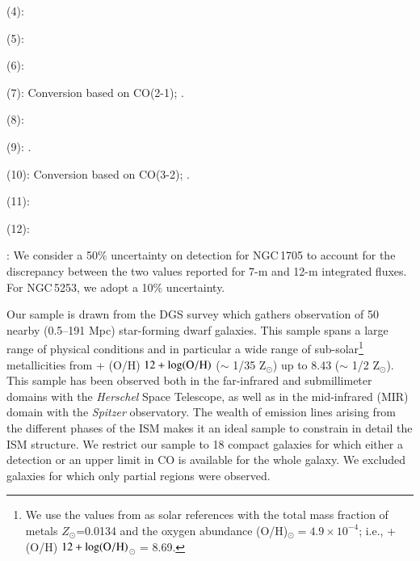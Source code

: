 \documentclass{aa}
\newcommand{\oh}{\ifmmode 12 + \log({\rm O/H}) \else$12 + \log({\rm O/H})$\fi}
\begin{document}
\begin{table}[t!]
\begin{threeparttable}
\begin{tablenotes}
   \item (4): \cite{Cormier_2014}
   \item (5): \cite{Kobulnicky_1995}
   \item (6): \cite{Young_1995}
   \item (7): Conversion based on CO(2-1); \cite{Zhou_co_2021}. %
   \item (8): \cite{Greve_1996}
   \item (9): \cite{Hunt_2023}. 
   \item (10): Conversion based on CO(3-2); \cite{Hunt_2014}. %
   \item (11): \cite{Sage_1992}
   \item (12): \cite{Leroy_2005}
   \item *: We consider a 50\% uncertainty on detection for  NGC\,1705 to account for the discrepancy between the two values reported for 7-m and 12-m integrated fluxes. For NGC\,5253, we adopt a 10\% uncertainty.
\end{tablenotes}

\end{threeparttable}
\end{table}

Our sample is drawn from the DGS survey \citep{Madden_2013} which gathers observation of 50 nearby (0.5--191 Mpc) star-forming dwarf galaxies. This sample spans a large range of physical conditions and in particular a wide range of sub-solar\footnote{We use the values from \cite{Asplund_2009} as solar references with the total mass fraction of metals $Z_{\odot}$=0.0134 and the oxygen abundance (O/H)$_{\odot} = 4.9 \times 10^{-4}$; i.e., \oh$_{\odot}$ = 8.69.} metallicities from \oh=7.14 ($\sim$ 1/35 Z$_\odot$) up to 8.43 ($\sim$ 1/2 Z$_\odot$).
This sample has been observed both in the far-infrared and submillimeter domains with the \textit{Herschel} Space Telescope, as well as in the mid-infrared (MIR) domain with the \textit{Spitzer} observatory. The wealth of emission lines arising from the different phases of the ISM makes it an ideal sample to constrain in detail the ISM structure. We restrict our sample to 18 compact galaxies for which either a detection or an upper limit in CO is available for the whole galaxy. We excluded galaxies for which only partial regions were observed. 
\end{document}

